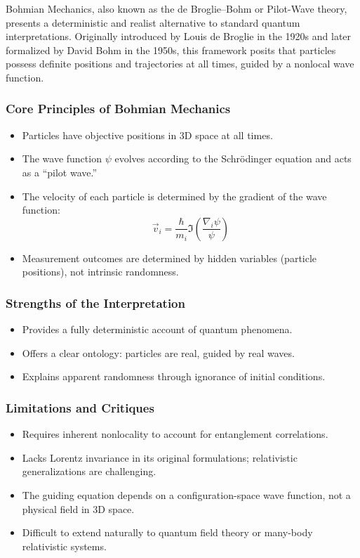\documentclass[12pt]{article}
\begin{document}
Bohmian Mechanics, also known as the de Broglie–Bohm or Pilot-Wave theory, presents a deterministic and realist alternative to standard quantum interpretations. Originally introduced by Louis de Broglie in the 1920s and later formalized by David Bohm in the 1950s, this framework posits that particles possess definite positions and trajectories at all times, guided by a nonlocal wave function.

\subsubsection*{Core Principles of Bohmian Mechanics}

\begin{itemize}
    \item Particles have objective positions in 3D space at all times.
    \item The wave function \( \psi \) evolves according to the Schrödinger equation and acts as a “pilot wave.”
    \item The velocity of each particle is determined by the gradient of the wave function:
    \begin{equation}
    \vec{v}_i = \frac{\hbar}{m_i} \Im \left( \frac{\nabla_i \psi}{\psi} \right)
    \end{equation}
    \item Measurement outcomes are determined by hidden variables (particle positions), not intrinsic randomness.
\end{itemize}

\subsubsection*{Strengths of the Interpretation}

\begin{itemize}
    \item Provides a fully deterministic account of quantum phenomena.
    \item Offers a clear ontology: particles are real, guided by real waves.
    \item Explains apparent randomness through ignorance of initial conditions.
\end{itemize}

\subsubsection*{Limitations and Critiques}

\begin{itemize}
    \item Requires inherent nonlocality to account for entanglement correlations.
    \item Lacks Lorentz invariance in its original formulations; relativistic generalizations are challenging.
    \item The guiding equation depends on a configuration-space wave function, not a physical field in 3D space.
    \item Difficult to extend naturally to quantum field theory or many-body relativistic systems.
\end{itemize}
\end{document}
